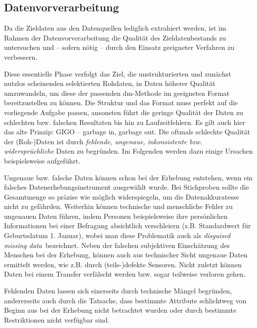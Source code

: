 \subsection{Datenvorverarbeitung}
\glqq Da die Zieldaten aus den Datenquellen lediglich extrahiert werden, ist im Rahmen der Datenvorverarbeitung die Qualität des Zieldatenbestands zu untersuchen und – sofern nötig – durch den Einsatz geeigneter Verfahren zu verbessern.\grqq{}

Diese essentielle Phase verfolgt das Ziel, die unstrukturierten und zunächst nutzlos scheinenden selektierten Rohdaten, in Daten höherer Qualität umzuwandeln, um diese der passenden \gls{dm}-Methode im geeigneten Format bereitzustellen zu können. Die Struktur und das Format muss perfekt auf die vorliegende Aufgabe passen, ansonsten führt die geringe Qualität der Daten zu schlechten bzw. falschen Resultaten bis hin zu Laufzeitfehlern. Es gilt auch hier das alte Prinzip: GIGO – garbage in, garbage out. Die oftmals schlechte Qualität der (Roh-)Daten ist durch \textit{fehlende, ungenaue, inkonsistente bzw. widersprüchliche} Daten zu begründen. Im Folgenden werden dazu einige Ursachen beispielsweise aufgeführt.

Ungenaue bzw. falsche Daten können schon bei der Erhebung entstehen, wenn ein falsches Datenerhebungsinstrument ausgewählt wurde. Bei Stichproben sollte die Gesamtmenge so präzise wie möglich widerspiegeln, um die Datenakkuratesse nicht zu gefährden. Weiterhin können technische und menschliche Fehler zu ungenauen Daten führen, indem Personen beispielsweise ihre persönlichen Informationen bei einer Befragung absichtlich verschleiern (z.B. Standardwert für Geburtsdatum 1. Januar), wobei man diese Problematik auch als \textit{\glqq disguised missing data\grqq}~bezeichnet. Neben der falschen subjektiven Einschätzung des Menschen bei der Erhebung, können auch aus technischer Sicht ungenaue Daten ermittelt werden, wie z.B. durch (teils-)defekte Sensoren. Nicht zuletzt können Daten bei einem Transfer verfälscht werden bzw. sogar teilweise verloren gehen.

Fehlenden Daten lassen sich einerseits durch technische Mängel begründen, andererseits auch durch die Tatsache, dass bestimmte Attribute schlichtweg von Beginn aus bei der Erhebung nicht betrachtet wurden oder durch bestimmte Restriktionen nicht verfügbar sind.

